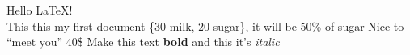 \documentclass{article}
\begin{document}
	Hello LaTeX!\\ %
	This this my first \quad document %
	\{30 milk, 20 sugar\}, it will be 50\% of sugar %
	Nice to ``meet you'' 40\$
	Make this text \textbf{bold} and this it's \textit{italic}
\end{document}

